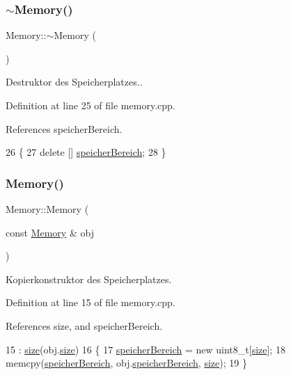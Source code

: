 \subsubsection{\texorpdfstring{$\sim$\+Memory()}{~Memory()}}
{\footnotesize\ttfamily Memory\+::$\sim$\+Memory (\begin{DoxyParamCaption}{ }\end{DoxyParamCaption})}

Destruktor des Speicherplatzes.. 

Definition at line 25 of file memory.\+cpp.



References speicher\+Bereich.


\begin{DoxyCode}
26 \{
27     \textcolor{keyword}{delete} [] \mbox{\hyperlink{class_memory_a31e171332b705e39bb13e421c7863a5f}{speicherBereich}};
28 \}
\end{DoxyCode}
\mbox{\label{class_memory_a074fa74eaf054e7e420c35c573b46e21}} 
\subsubsection{\texorpdfstring{Memory()}{Memory()}\hspace{0.1cm}{\footnotesize\ttfamily [2/2]}}
{\footnotesize\ttfamily Memory\+::\+Memory (\begin{DoxyParamCaption}\item[{const \mbox{\hyperlink{class_memory}{Memory}} \&}]{obj }\end{DoxyParamCaption})}

Kopierkonstruktor des Speicherplatzes. 

Definition at line 15 of file memory.\+cpp.



References size, and speicher\+Bereich.


\begin{DoxyCode}
15                                 : \mbox{\hyperlink{class_memory_a97e5472d284e8daceeb740acb2170ae0}{size}}(obj.\mbox{\hyperlink{class_memory_a97e5472d284e8daceeb740acb2170ae0}{size}})
16 \{
17     \mbox{\hyperlink{class_memory_a31e171332b705e39bb13e421c7863a5f}{speicherBereich}} = \textcolor{keyword}{new} uint8\_t[\mbox{\hyperlink{class_memory_a97e5472d284e8daceeb740acb2170ae0}{size}}];
18     memcpy(\mbox{\hyperlink{class_memory_a31e171332b705e39bb13e421c7863a5f}{speicherBereich}}, obj.\mbox{\hyperlink{class_memory_a31e171332b705e39bb13e421c7863a5f}{speicherBereich}}, 
      \mbox{\hyperlink{class_memory_a97e5472d284e8daceeb740acb2170ae0}{size}});
19 \}
\end{DoxyCode}


